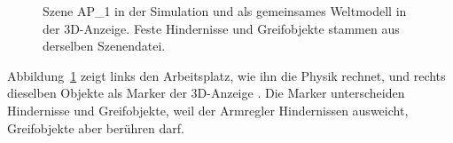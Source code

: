 \begin{figure}[htbp]
  \centering
  \caption[Szene eines Arbeitsplatzes in Simulation und 3D-Anzeige]{Szene AP\_1 in der Simulation und als gemeinsames Weltmodell in der 3D-Anzeige. Feste Hindernisse und Greifobjekte stammen aus derselben Szenendatei.}
  \label{fig:szene}
\end{figure}

Abbildung~\ref{fig:szene} zeigt links den Arbeitsplatz, wie ihn die Physik rechnet, und rechts dieselben Objekte als Marker der 3D-Anzeige .
Die Marker unterscheiden Hindernisse und Greifobjekte, weil der Armregler Hindernissen ausweicht, Greifobjekte aber berühren darf.
